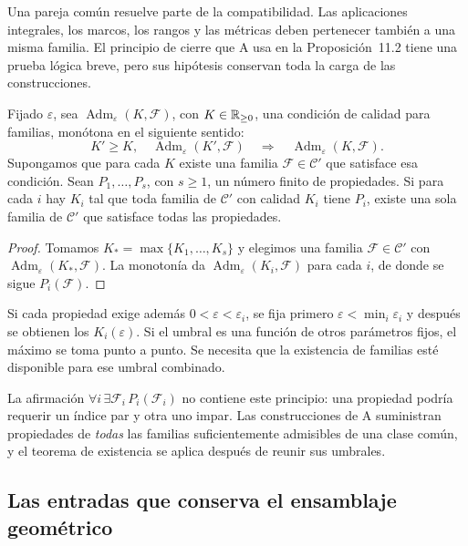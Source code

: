 Una pareja común resuelve parte de la compatibilidad. Las aplicaciones
integrales, los marcos, los rangos y las métricas deben pertenecer
también a una misma familia. El principio de cierre que A usa en
la Proposición~11.2 tiene una prueba lógica breve, pero sus hipótesis
conservan toda la carga de las construcciones.

\begin{lema}
\label{lem:par-umbral-comun}
Fijado $\varepsilon$, sea $\operatorname{Adm}_\varepsilon(K,\mathcal F)$,
con $K\in\mathbb{R}_{\ge0}$, una condición de calidad para familias,
monótona en el siguiente
sentido:
\[
 K'\ge K,\quad
 \operatorname{Adm}_\varepsilon(K',\mathcal F)
 \quad\Longrightarrow\quad
 \operatorname{Adm}_\varepsilon(K,\mathcal F).
\]
Supongamos que para cada $K$ existe una familia
$\mathcal F\in\mathcal C'$ que satisface esa condición.
Sean $P_1,\ldots,P_s$, con $s\ge1$, un número finito de propiedades. Si para cada
$i$ hay $K_i$ tal que toda familia de $\mathcal C'$ con calidad
$K_i$ tiene $P_i$, existe una sola familia de $\mathcal C'$
que satisface todas las propiedades.
\end{lema}

\begin{proof}
Tomamos $K_*=\max\{K_1,\ldots,K_s\}$ y elegimos una familia
$\mathcal F\in\mathcal C'$ con
$\operatorname{Adm}_\varepsilon(K_*,\mathcal F)$.
La monotonía da
$\operatorname{Adm}_\varepsilon(K_i,\mathcal F)$ para cada $i$,
de donde se sigue $P_i(\mathcal F)$.
\end{proof}

Si cada propiedad exige además
$0<\varepsilon<\varepsilon_i$, se fija primero
$\varepsilon<\min_i\varepsilon_i$ y después se obtienen los
$K_i(\varepsilon)$. Si el umbral es una función de otros parámetros
fijos, el máximo se toma punto a punto. Se necesita que la existencia
de familias esté disponible para ese umbral combinado.

La afirmación $\forall i\,\exists\mathcal F_i\,P_i(\mathcal F_i)$
no contiene este principio: una propiedad podría requerir un índice
par y otra uno impar. Las construcciones de A suministran propiedades
de \emph{todas} las familias suficientemente admisibles de una clase
común, y el teorema de existencia se aplica después de reunir
sus umbrales.

\subsection{Las entradas que conserva el ensamblaje geométrico}

